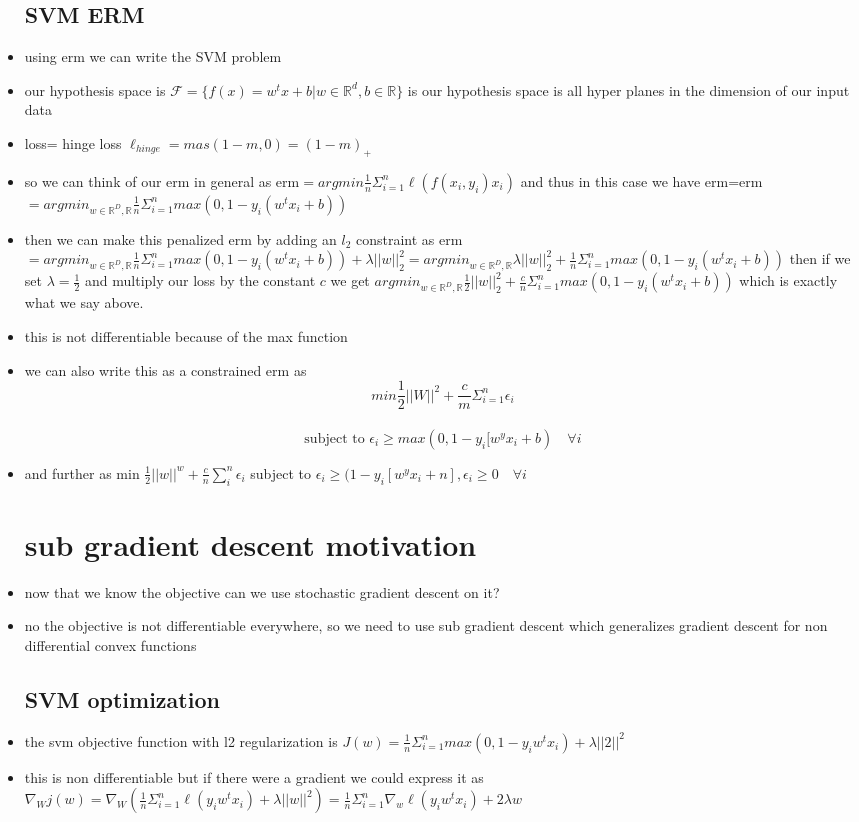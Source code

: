 \documentclass{article}
\begin{document}
\begin{itemize}
\subsection{SVM ERM}
\item using erm we can write the SVM problem 
\item our hypothesis space is $\mathcal{F}=\{f(x)=w^{t}x+b|w\in \mathbb{R}^{d}, b\in \mathbb{R}\}$ is our hypothesis space is all hyper planes in the dimension of our input data  
\item  loss= hinge loss $\ell_{hinge}=mas(1-m,0)=(1-m)_{+}$
\item so we can think of our erm in general as erm$=argmin\frac{1}{n}\Sigma_{i=1}^{n}\ell(f(x_i,y_i)x_i)$ and thus in this case we have erm=erm$=argmin_{w\in \mathbb{R}^{D},\mathbb{R}}\frac{1}{n}\Sigma_{i=1}^{n}max(0,1-y_i(w^{t}x_i+b))$ 
\item then we can make this penalized erm by adding an $l_2$ constraint as erm$=argmin_{w\in \mathbb{R}^{D},\mathbb{R}}\frac{1}{n}\Sigma_{i=1}^{n}max(0,1-y_i(w^{t}x_i+b))+\lambda||w||_{2}^{2}=argmin_{w\in \mathbb{R}^{D},\mathbb{R}}\lambda||w||_{2}^{2}+ \frac{1}{n}\Sigma_{i=1}^{n}max(0,1-y_i(w^{t}x_i+b))$ then if we set $\lambda=\frac{1}{2}$ and multiply our loss by the constant $c$ we get $argmin_{w\in \mathbb{R}^{D},\mathbb{R}}\frac{1}{2}||w||_{2}^{2}+ \frac{c}{n}\Sigma_{i=1}^{n}max(0,1-y_i(w^{t}x_i+b))$ which is exactly what we say above. 
\item this is not differentiable because of the max function 
\item we can also write this as a constrained erm as $$min \frac{1}{2}||W||^{2}+\frac{c}{m}\Sigma_{i=1}^{n}\epsilon_{i}$$ \\ $$\text{subject to } \epsilon_{i}\geq max(0,1-y_{i}[w^{y}x_i+b)\quad \forall i$$
\item and further as min $\frac{1}{2}||w||^{w}+\frac{c}{n}\sum_{i}^{n}\epsilon_{i}$ subject to $\epsilon_{i}\geq (1-y_{i}[w^{y}x_i+n], \epsilon_{i}\geq 0 \quad \forall i $
\section{sub gradient descent motivation}
\item now that we know the objective can we use stochastic gradient descent on it? 
\item no the objective is not differentiable everywhere, so we need to use sub gradient descent which generalizes gradient descent for non differential convex functions 
\subsection{SVM optimization}
\item the svm objective function with l2 regularization is $J(w)=\frac{1}{n}\Sigma_{i=1}^{n}max(0,1-y_{i}w^{t}x_{i})+\lambda||2||^{2}$
\item this is non differentiable but if there were a gradient we could express it as $\nabla _{W}j(w)=\nabla_{W}(\frac{1}{n}\Sigma_{i=1}^{n}\ell(y_iw^{t}x_i)+\lambda||w||^{2})=\frac{1}{n}\Sigma_{i=1}^{n}\nabla_{w}\ell(y_iw^{t}x_i)+2\lambda w$

\end{itemize}
\end{document}
